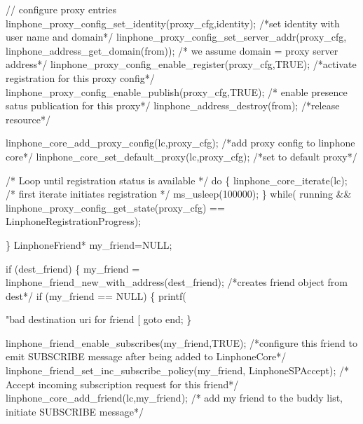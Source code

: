 \begin{DoxyCodeInclude}
{{{{                \textcolor{comment}{// configure proxy entries}
                linphone_proxy_config_set_identity(proxy\_cfg,identity); \textcolor{comment}{/*set identity with user name and
       domain*/}
                linphone_proxy_config_set_server_addr(proxy\_cfg,
      linphone_address_get_domain(from)); \textcolor{comment}{/* we assume domain = proxy server address*/}
                linphone_proxy_config_enable_register(proxy\_cfg,TRUE); \textcolor{comment}{/*activate registration for this
       proxy config*/}
                linphone_proxy_config_enable_publish(proxy\_cfg,TRUE); \textcolor{comment}{/* enable presence satus publication
       for this proxy*/}
                linphone_address_destroy(from); \textcolor{comment}{/*release resource*/}

                linphone_core_add_proxy_config(lc,proxy\_cfg); \textcolor{comment}{/*add proxy config to linphone core*/}
                linphone_core_set_default_proxy(lc,proxy\_cfg); \textcolor{comment}{/*set to default proxy*/}


                \textcolor{comment}{/* Loop until registration status is available */}
                \textcolor{keywordflow}{do} \{
                        linphone_core_iterate(lc); \textcolor{comment}{/* first iterate initiates registration */}
                        ms\_usleep(100000);
                \}
                \textcolor{keywordflow}{while}(  running && linphone_proxy_config_get_state(proxy\_cfg) == 
      LinphoneRegistrationProgress);

        \}
        LinphoneFriend* my\_friend=NULL;

        \textcolor{keywordflow}{if} (dest\_friend) \{
                my\_friend = linphone_friend_new_with_address(dest\_friend); \textcolor{comment}{/*creates friend object from
       dest*/}
                \textcolor{keywordflow}{if} (my\_friend == NULL) \{
                        printf(\textcolor{stringliteral}{"bad destination uri for friend [%
                        \textcolor{keywordflow}{goto} end;
                \}

                linphone_friend_enable_subscribes(my\_friend,TRUE); \textcolor{comment}{/*configure this friend to emit
       SUBSCRIBE message after being added to LinphoneCore*/}
                linphone_friend_set_inc_subscribe_policy(my\_friend,
      LinphoneSPAccept); \textcolor{comment}{/* Accept incoming subscription request for this friend*/}
                linphone_core_add_friend(lc,my\_friend); \textcolor{comment}{/* add my friend to the buddy list, initiate
       SUBSCRIBE message*/}

}}}}}
\end{DoxyCodeInclude}

